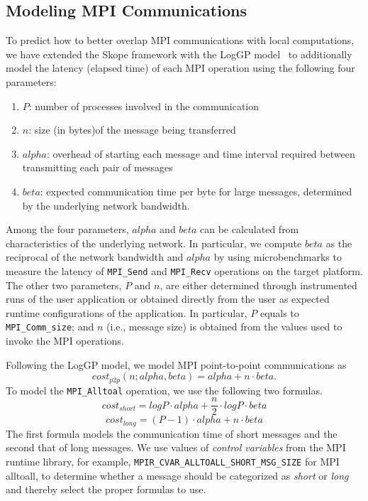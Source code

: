 \subsection{Modeling MPI Communications}

To predict how to better overlap MPI communications with local computations, we have extended the Skope framework
with the LogGP model~\cite{loggp} to additionally model the latency (elapsed time) of each MPI operation using the following four parameters:
  \begin{enumerate}
  \item $P$: number of processes involved in the communication %
  \item $n$: size (in bytes)of the message being transferred 
  \item $alpha$: overhead of starting each message and time interval required between transmitting each pair of messages
  \item $beta$:  expected communication time per byte for large messages,  determined by the underlying network bandwidth.
\end{enumerate}
Among the four parameters, $alpha$ and $beta$ can be calculated from characteristics of the underlying network.
In particular, we compute $beta$ as the reciprocal of the network bandwidth  and $alpha$ by using microbenchmarks to measure the latency of \texttt{MPI\_Send} and \texttt{MPI\_Recv} operations on the target platform.
The other two parameters,  $P$ and $n$, are either determined through instrumented runs of the user application or obtained directly from the user as expected runtime configurations of the application.
 In particular, $P$ equals to \texttt{MPI\_Comm\_size};  and $n$ (i.e., message size) is obtained from the values used to invoke the MPI operations.

Following the LogGP model, we model MPI point-to-point communications as
\begin{equation}
cost_{p2p}(n;alpha,beta) = alpha + n\cdot beta .
\end{equation}
To model the \texttt{MPI\_Alltoal} operation,  we use the following two formulas.
\begin{equation}
  cost_{short} = log P\cdot alpha + \frac{n}{2}\cdot log P\cdot beta
\end{equation}
\begin{equation}
cost_{long} = (P-1)\cdot alpha + n\cdot beta
\end{equation}
The first formula models the communication time of short messages and the second that of long messages.
We use values of \emph{control variables} from  the MPI runtime library, for example, \texttt{MPIR\_CVAR\_ALLTOALL\_SHORT\_MSG\_SIZE} for MPI alltoall,
to determine whether a message should be categorized as {\em short} or {\em long} and thereby select the proper formulas to use.

